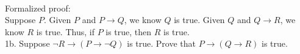 \documentclass{article}
\begin{document}
\\
Formalized proof:\\
Suppose $P$. Given $P$ and $P \rightarrow Q$, we know $Q$ is true. Given $Q$ and $Q \rightarrow R$, we know $R$ is true. Thus, if $P$ is true, then $R$ is true.\\

\noindent 1b. Suppose $\neg R \rightarrow (P \rightarrow \neg Q)$ is true. Prove that $P \rightarrow (Q \rightarrow R)$ is true.\\
\end{document}
